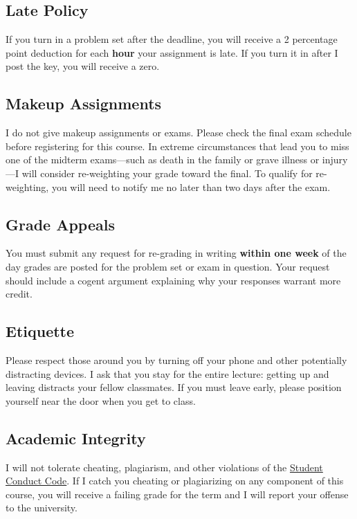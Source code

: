 \documentclass[11pt]{article}
\begin{document}
\subsection*{Late Policy} 

If you turn in a problem set after the deadline, you will receive a 2 percentage point deduction for each \textbf{hour} your assignment is late. If you turn it in after I post the key, you will receive a zero.

\subsection*{Makeup Assignments} 

I do not give makeup assignments or exams. Please check the final exam schedule before registering for this course. In extreme circumstances that lead you to miss one of the midterm exams---such as death in the family or grave illness or injury---I will consider re-weighting your grade toward the final. To qualify for re-weighting, you will need to notify me no later than two days after the exam.

\subsection*{Grade Appeals} 

You must submit any request for re-grading in writing \textbf{within one week} of the day grades are posted for the problem set or exam in question. Your request should include a cogent argument explaining why your responses warrant more credit.

\subsection*{Etiquette} 

Please respect those around you by turning off your phone and other potentially distracting devices. I ask that you stay for the entire lecture: getting up and leaving distracts your fellow classmates. If you must leave early, please position yourself near the door when you get to class. 

\subsection*{Academic Integrity} 

I will not tolerate cheating, plagiarism, and other violations of the \href{https://studentlife.uoregon.edu/conduct}{Student Conduct Code}. If I catch you cheating or plagiarizing on any component of this course, you will receive a failing grade for the term and I will report your offense to the university. 
\end{document}
